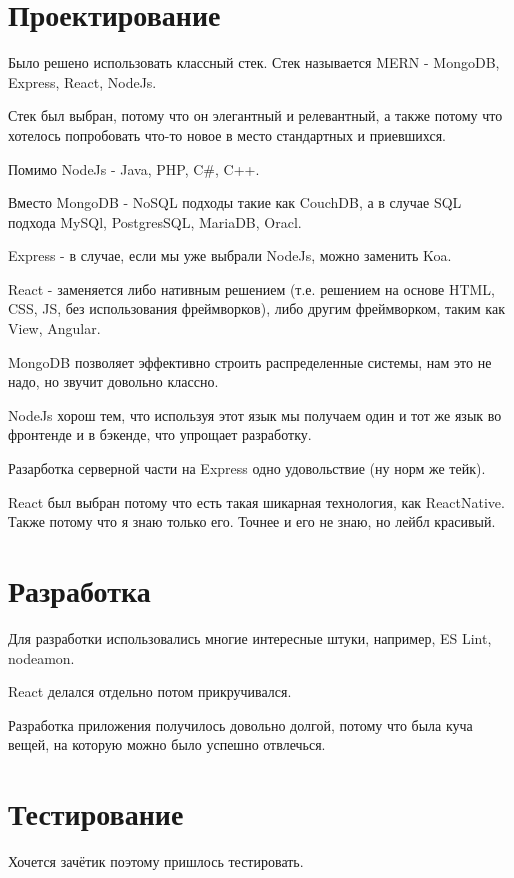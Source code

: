 \section{Проектирование}

	Было решено использовать классный стек.
	Стек называется MERN - MongoDB, Express, React, NodeJs.
	
	Стек был выбран, потому что он элегантный и релевантный, а также потому что
	хотелось попробовать что-то новое в место стандартных и приевшихся.
	
	Помимо NodeJs - Java, PHP, C\#, C++.

	Вместо MongoDB - NoSQL подходы  такие как CouchDB, а в случае SQL подхода
	MySQl, PostgresSQL, MariaDB, Oracl.

	Express - в случае, если мы уже выбрали NodeJs, можно заменить Koa.

	React - заменяется либо нативным решением (т.е. решением на основе HTML, CSS, JS,
	без использования фреймворков), либо другим фреймворком, таким как View, Angular.

	MongoDB позволяет эффективно строить распределенные системы, нам это не надо, но
	звучит довольно классно.

	NodeJs хорош тем, что используя этот язык мы получаем один и тот же язык во фронтенде
	и в бэкенде, что упрощает разработку.
	
	Разарботка серверной части на Express одно удовольствие (ну норм же тейк).

	React был выбран потому что есть такая шикарная технология, как ReactNative.
	Также потому что я знаю только его. Точнее и его не знаю, но лейбл красивый.


 	
\section{Разработка}
	Для разработки использовались многие интересные штуки,
	например, ES Lint, nodeamon.

	React делался отдельно потом прикручивался.

	Разработка приложения получилось довольно долгой, потому что была куча вещей, на которую
	можно было успешно отвлечься.


 	
\section{Тестирование}
	Хочется зачётик поэтому пришлось тестировать.
		 
